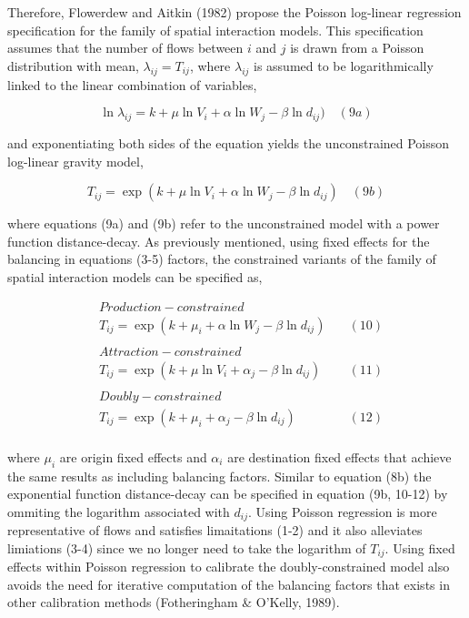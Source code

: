 \documentclass[11pt]{article}
\begin{document}
Therefore, Flowerdew and Aitkin (1982) propose the Poisson log-linear
regression specification for the family of spatial interaction models.
This specification assumes that the number of flows between \(i\) and
\(j\) is drawn from a Poisson distribution with mean,
\(\lambda_{ij} = T_{ij}\), where \(\lambda_{ij}\) is assumed to be
logarithmically linked to the linear combination of variables,

\[\ln{\lambda_{ij}} = k + \mu \ln V_{i} + \alpha \ln W_{j} - \beta \ln d_{ij}) \quad (9a)\]

and exponentiating both sides of the equation yields the unconstrained
Poisson log-linear gravity model,

\[T_{ij} = \exp(k + \mu \ln V_{i} + \alpha \ln W_{j} - \beta \ln d_{ij}) \quad (9b) \]

where equations (9a) and (9b) refer to the unconstrained model with a
power function distance-decay. As previously mentioned, using fixed
effects for the balancing in equations (3-5) factors, the constrained
variants of the family of spatial interaction models can be specified
as,

\[
\begin{align}
&Production-constrained \\
&T_{ij} = \exp(k + \mu_{i} + \alpha \ln W_{j} - \beta \ln d_{ij}) \quad & (10) \\
\\
&Attraction-constrained \\
&T_{ij} = \exp(k + \mu \ln V_{i} + \alpha_{j} - \beta \ln d_{ij}) \quad & (11) \\
\\
&Doubly-constrained \\
&T_{ij} = \exp(k + \mu_{i} + \alpha_{j} - \beta \ln d_{ij}) \quad & (12) \\
\end{align}
\]

where \(\mu_{i}\) are origin fixed effects and \(\alpha_{i}\) are
destination fixed effects that achieve the same results as including
balancing factors. Similar to equation (8b) the exponential function
distance-decay can be specified in equation (9b, 10-12) by ommiting the
logarithm associated with \(d_{ij}\). Using Poisson regression is more
representative of flows and satisfies limaitations (1-2) and it also
alleviates limiations (3-4) since we no longer need to take the
logarithm of \(T_{ij}\). Using fixed effects within Poisson regression
to calibrate the doubly-constrained model also avoids the need for
iterative computation of the balancing factors that exists in other
calibration methods (Fotheringham \& O'Kelly, 1989).
\end{document}
